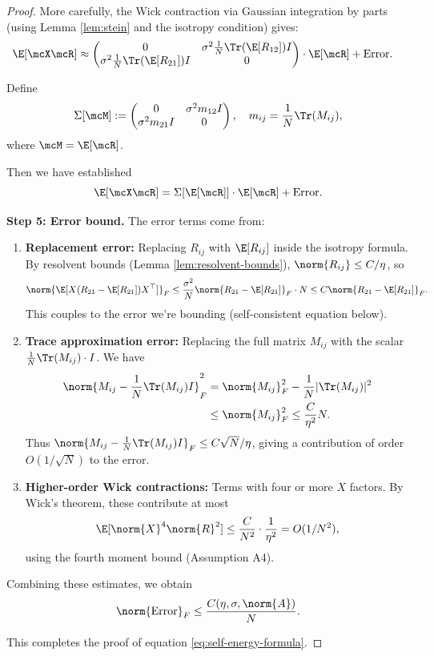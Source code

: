 \begin{proof}
More carefully, the Wick contraction via Gaussian integration by parts (using Lemma \ref{lem:stein} and the isotropy condition) gives:
\begin{align}
\E[\mcX \mcR]
&\approx \begin{pmatrix} 0 & \sigma^2 \frac{1}{N}\Tr(\E[R_{12}]) I \\ \sigma^2 \frac{1}{N}\Tr(\E[R_{21}]) I & 0 \end{pmatrix} \cdot \E[\mcR] + \text{Error}.
\end{align}

Define
\begin{equation}
\Sigma[\mcM] := \begin{pmatrix} 0 & \sigma^2 m_{12} I \\ \sigma^2 m_{21} I & 0 \end{pmatrix},
\quad
m_{ij} = \frac{1}{N}\Tr(M_{ij}),
\end{equation}
where $\mcM = \E[\mcR]$.

Then we have established
\begin{equation}\label{eq:wick-closure}
\E[\mcX \mcR] = \Sigma[\E[\mcR]] \cdot \E[\mcR] + \text{Error}.
\end{equation}

\textbf{Step 5: Error bound.} The error terms come from:
\begin{enumerate}
\item \textbf{Replacement error:} Replacing $R_{ij}$ with $\E[R_{ij}]$ inside the isotropy formula. By resolvent bounds (Lemma \ref{lem:resolvent-bounds}), $\norm{R_{ij}} \leq C/\eta$, so
\[
\norm{\E[X (R_{21} - \E[R_{21}]) X^\top]}_F \leq \frac{\sigma^2}{N} \norm{R_{21} - \E[R_{21}]}_F \cdot N \leq C \norm{R_{21} - \E[R_{21}]}_F.
\]
This couples to the error we're bounding (self-consistent equation below).

\item \textbf{Trace approximation error:} Replacing the full matrix $M_{ij}$ with the scalar $\frac{1}{N}\Tr(M_{ij}) \cdot I$. We have
\begin{align}
\norm{M_{ij} - \frac{1}{N}\Tr(M_{ij}) I}_F^2
&= \norm{M_{ij}}_F^2 - \frac{1}{N}|\Tr(M_{ij})|^2 \\
&\leq \norm{M_{ij}}_F^2 \leq \frac{C}{\eta^2} N.
\end{align}
Thus $\norm{M_{ij} - \frac{1}{N}\Tr(M_{ij}) I}_F \leq C\sqrt{N}/\eta$, giving a contribution of order $O(1/\sqrt{N})$ to the error.

\item \textbf{Higher-order Wick contractions:} Terms with four or more $X$ factors. By Wick's theorem, these contribute at most
\[
\E[\norm{X}^4 \norm{R}^2] \leq \frac{C}{N^2} \cdot \frac{1}{\eta^2} = O(1/N^2),
\]
using the fourth moment bound (Assumption A4).
\end{enumerate}

Combining these estimates, we obtain
\begin{equation}
\norm{\text{Error}}_F \leq \frac{C(\eta, \sigma, \norm{A})}{N}.
\end{equation}

This completes the proof of equation \eqref{eq:self-energy-formula}.
\end{proof}
